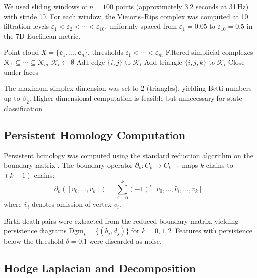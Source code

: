 \documentclass[11pt,a4paper]{article}
\begin{document}
We used sliding windows of $n = 100$ points (approximately 3.2 seconds at 31\,Hz) with stride 10.
For each window, the Vietoris--Rips complex was computed at 10 filtration levels $\varepsilon_1 < \varepsilon_2 < \cdots < \varepsilon_{10}$, uniformly spaced from $\varepsilon_1 = 0.05$ to $\varepsilon_{10} = 0.5$ in the 7D Euclidean metric.

\begin{algorithm}
\caption{Vietoris--Rips Filtration for Consciousness Point Cloud}
\label{alg:vr}
\begin{algorithmic}[1]
\REQUIRE Point cloud $X = \{\mathbf{c}_1, \ldots, \mathbf{c}_n\}$, thresholds $\varepsilon_1 < \cdots < \varepsilon_m$
\ENSURE Filtered simplicial complexes $\mathcal{K}_1 \subseteq \cdots \subseteq \mathcal{K}_m$
  \STATE $\mathcal{K}_l \leftarrow \emptyset$
      \STATE Add edge $\{i, j\}$ to $\mathcal{K}_l$
    \ENDIF
  \ENDFOR
    \STATE Add triangle $\{i, j, k\}$ to $\mathcal{K}_l$
  \ENDFOR
  \STATE Close under faces
\ENDFOR
\end{algorithmic}
\end{algorithm}

The maximum simplex dimension was set to 2 (triangles), yielding Betti numbers up to $\beta_2$.
Higher-dimensional computation is feasible but unnecessary for state classification.

\subsection{Persistent Homology Computation}

Persistent homology was computed using the standard reduction algorithm on the boundary matrix \citep{zomorodian2005computing}.
The boundary operator $\partial_k: C_k \to C_{k-1}$ maps $k$-chains to $(k-1)$-chains:
\[
\partial_k([v_0, \ldots, v_k]) = \sum_{i=0}^{k} (-1)^i [v_0, \ldots, \hat{v}_i, \ldots, v_k]
\]
where $\hat{v}_i$ denotes omission of vertex $v_i$.

Birth-death pairs were extracted from the reduced boundary matrix, yielding persistence diagrams $\mathrm{Dgm}_k = \{(b_j, d_j)\}$ for $k = 0, 1, 2$.
Features with persistence below the threshold $\delta = 0.1$ were discarded as noise.

\subsection{Hodge Laplacian and Decomposition}
\end{document}
